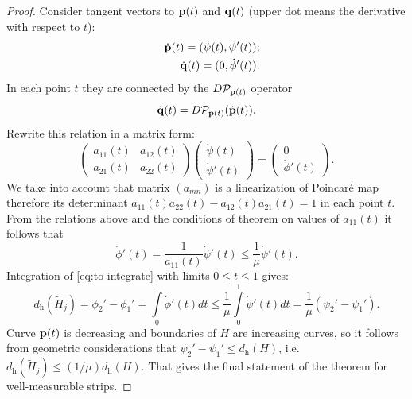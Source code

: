 \begin{proof}
	Consider tangent vectors to $\vb{p}(t)$ and $\vb{q}(t)$ (upper dot means the derivative with respect to $t$):
	\begin{eqnarray}
		&& \dot{\vb{p}}(t) = (\dot{\psi}(t), \dot{\psi}'(t)); \\
		&& \dot{\vb{q}}(t) = (0, \dot{\phi}'(t)).
	\end{eqnarray}
	In each point $t$ they are connected by the $D \mathcal{P}_{\vb{p}(t)}$ operator
	\begin{equation}
		\dot{\vb{q}}(t) = D \mathcal{P}_{\vb{p}(t)} (\dot{\vb{p}}(t)).
	\end{equation}
	Rewrite this relation in a matrix form:
	\begin{equation}
		\begin{pmatrix}
			a_{11}(t) & a_{12}(t) \\ a_{21}(t) & a_{22}(t)
		\end{pmatrix}
		\begin{pmatrix}
			\dot{\psi}(t) \\
			\dot{\psi}'(t)
		\end{pmatrix} =
		\begin{pmatrix}
			0 \\ \dot{\phi}'(t)
		\end{pmatrix}.
	\end{equation}
	We take into account that matrix $(a_{mn})$ is a linearization of Poincar\'e map therefore its determinant $a_{11}(t) a_{22}(t) - a_{12}(t) a_{21}(t) = 1$ in each point $t$.
	From the relations above and the conditions of theorem on values of $a_{11}(t)$ it follows that
	\begin{equation}
		\dot{\phi}'(t) = \dfrac{1}{a_{11}(t)} \dot{\psi}'(t) \le \dfrac{1}{\mu} \dot{\psi}'(t).
	\label{eq:to-integrate}
	\end{equation}
	Integration of \eqref{eq:to-integrate} with limits $0 \le t \le 1$ gives:
	\begin{equation}
		d_{\mathrm{h}}(\widetilde{H}_j) = \phi_2' - \phi_1' = \int \limits_0^1 \dot{\phi}'(t) dt \le \dfrac{1}{\mu} \int \limits_0^1 \dot{\psi}'(t) dt = \dfrac{1}{\mu} (\psi_2' - \psi_1').
	\label{eq:thickness-of-strip-final}
	\end{equation}
	Curve $\vb{p}(t)$ is decreasing and boundaries of $H$ are increasing curves, so it follows from geometric considerations that $\psi_2' - \psi_1' \le d_{\mathrm{h}}(H)$, i.e. $d_{\mathrm{h}}(\widetilde{H}_j) \le (1 / \mu) d_{\mathrm{h}}(H)$.
	That gives the final statement of the theorem for well-measurable strips.
	

\end{proof}
